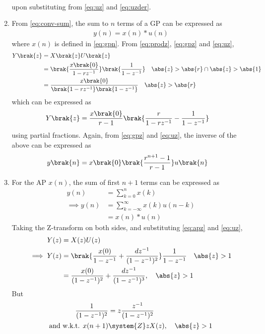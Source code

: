 \begin{enumerate}[label=\thechapter.\arabic*,ref=\thechapter.\theenumi]
\begin{align}
	       \label{eq:apz}
\end{align}
upon substituting from 
	       \eqref{eq:uz}
	       and
	       \eqref{eq:uzder}.
\item From 
	\eqref{eq:conv-sum},  the sum to $n$ terms  of a GP can be expressed as
\begin{align}
	y(n) = x(n)*u(n) 
\end{align}
		where $x(n)$ is defined in 
	       \eqref{eq:gpn}.
From \eqref{eq:prodz}, \eqref{eq:gpz} and \eqref{eq:uz},
\begin{align}
	Y\brak{z}&= X\brak{z} U\brak{z}
	\\
	&=\brak{\frac{x\brak{0}}{1-rz^{-1}}}\brak{\frac{1}{1-z^{-1}}} \quad \abs{z} > \abs{r} \cap \abs{z}>\abs{1}
	\\
	&=\frac{x\brak{0}}{\brak{1-rz^{-1}}\brak{1-z^{-1}}} \quad \abs{z} > \abs{r} 
\end{align}
which can be expressed as
\begin{align}
	Y\brak{z}&=\frac{x\brak{0}}{r-1}\brak{\frac{r}{1-rz^{-1}} - \frac{1}{1-z^{-1}}}
\end{align}
using partial fractions.  Again, from \eqref{eq:gpz} and \eqref{eq:uz}, the inverse of the above can be expressed as
\begin{align}
	y\brak{n}
	&=x\brak{0}\brak{\frac{r^{n+1}-1}{r-1}}u\brak{n}
\end{align}
\item For the AP $x(n)$, the sum of first $n+1$ terms can be expressed as
\begin{align}
y(n) &= \sum_{k=0}^{n} x(k)\\
\implies y(n) &= \sum_{k=-\infty}^{\infty} x(k) u(n-k)\\
&= x(n) * u(n)
\end{align}
Taking the Z-transform on both sides, and substituting \eqref{eq:apz} and \eqref{eq:uz},
\begin{align}
Y(z) &= X(z) U(z)\\
\implies Y(z) &= \brak{\frac{x(0)}{1-z^{-1}} + \frac{dz^{-1}}{(1-z^{-1})^{2}}}\frac{1}{1-z^{-1}} \quad \abs{z} > 1 \\
&= \frac{x(0)}{({1-z^{-1}})^2} + \frac{dz^{-1}}{(1-z^{-1})^{3}}, \quad \abs{z} > 1 \label{eq:APSum}
\end{align}
But
\begin{align}
\frac{1}{({1-z^{-1}})^2} &= z\frac{z^{-1}}{({1-z^{-1}})^2}\\
\text{and w.k.t. } x(n+1) &\system{Z} zX(z), \quad \abs{z} > 1 
\end{align}

\end{enumerate}

